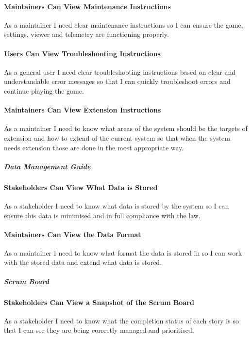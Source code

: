 \paragraph{Maintainers Can View Maintenance Instructions}
As a maintainer I need clear maintenance instructions so I can ensure the game, settings, viewer and telemetry are functioning properly.

\paragraph{Users Can View Troubleshooting Instructions}
As a general user I need clear troubleshooting instructions based on clear and understandable error messages so that I can quickly troubleshoot errors and continue playing the game.

\paragraph{Maintainers Can View Extension Instructions}
As a maintainer I need to know what areas of the system should be the targets of extension and how to extend of the current system so that when the system needs extension those are done in the most appropriate way.

\subparagraph{Data Management Guide}

\paragraph{Stakeholders Can View What Data is Stored}
As a stakeholder I need to know what data is stored by the system so I can ensure this data is minimised and in full compliance with the law.

\paragraph{Maintainers Can View the Data Format}
As a maintainer I need to know what format the data is stored in so I can work with the stored data and extend what data is stored.

\subparagraph{Scrum Board}

\paragraph{Stakeholders Can View a Snapshot of the Scrum Board}
As a stakeholder I need to know what the completion status of each story is so that I can see they are being correctly managed and prioritised.

